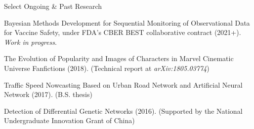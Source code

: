 \documentclass{resume} %
\begin{document}
\begin{rSection}{Select Ongoing \& Past Research}










Bayesian Methods Development for Sequential Monitoring of Observational Data for Vaccine Safety, under FDA's CBER BEST collaborative contract (2021+). \emph{Work in progress}.

\smallskip


The Evolution of Popularity and Images of Characters in Marvel Cinematic Universe Fanfictions (2018). (Technical report at \emph{arXiv:1805.03774})

\smallskip

Traffic Speed Nowcasting Based on Urban Road Network and Artificial Neural Network (2017). (B.S. thesis)

\smallskip

Detection of Differential Genetic Networks (2016). (Supported by the National Undergraduate Innovation Grant of China)


\end{rSection}
\end{document}
